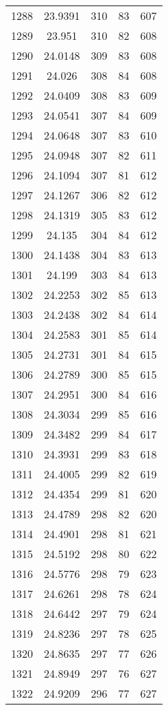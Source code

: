 \documentclass[12pt,a4paper]{article}
\begin{document}
\begin{tabular}{r|cccc}
	1288 & 23.9391 & 310 & 83 & 607 \\
	1289 & 23.951 & 310 & 82 & 608 \\
	1290 & 24.0148 & 309 & 83 & 608 \\
	1291 & 24.026 & 308 & 84 & 608 \\
	1292 & 24.0409 & 308 & 83 & 609 \\
	1293 & 24.0541 & 307 & 84 & 609 \\
	1294 & 24.0648 & 307 & 83 & 610 \\
	1295 & 24.0948 & 307 & 82 & 611 \\
	1296 & 24.1094 & 307 & 81 & 612 \\
	1297 & 24.1267 & 306 & 82 & 612 \\
	1298 & 24.1319 & 305 & 83 & 612 \\
	1299 & 24.135 & 304 & 84 & 612 \\
	1300 & 24.1438 & 304 & 83 & 613 \\
	1301 & 24.199 & 303 & 84 & 613 \\
	1302 & 24.2253 & 302 & 85 & 613 \\
	1303 & 24.2438 & 302 & 84 & 614 \\
	1304 & 24.2583 & 301 & 85 & 614 \\
	1305 & 24.2731 & 301 & 84 & 615 \\
	1306 & 24.2789 & 300 & 85 & 615 \\
	1307 & 24.2951 & 300 & 84 & 616 \\
	1308 & 24.3034 & 299 & 85 & 616 \\
	1309 & 24.3482 & 299 & 84 & 617 \\
	1310 & 24.3931 & 299 & 83 & 618 \\
	1311 & 24.4005 & 299 & 82 & 619 \\
	1312 & 24.4354 & 299 & 81 & 620 \\
	1313 & 24.4789 & 298 & 82 & 620 \\
	1314 & 24.4901 & 298 & 81 & 621 \\
	1315 & 24.5192 & 298 & 80 & 622 \\
	1316 & 24.5776 & 298 & 79 & 623 \\
	1317 & 24.6261 & 298 & 78 & 624 \\
	1318 & 24.6442 & 297 & 79 & 624 \\
	1319 & 24.8236 & 297 & 78 & 625 \\
	1320 & 24.8635 & 297 & 77 & 626 \\
	1321 & 24.8949 & 297 & 76 & 627 \\
	1322 & 24.9209 & 296 & 77 & 627 \\

\end{tabular}
\end{document}
